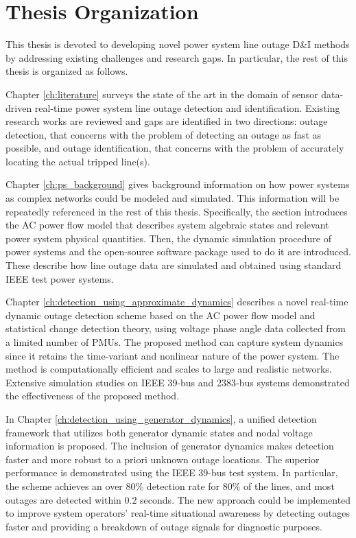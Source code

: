 \section{Thesis Organization}
This thesis is devoted to developing novel power system line outage D\&I methods by addressing existing challenges and research gaps. In particular, the rest of this thesis is organized as follows.

Chapter \ref{ch:literature} surveys the state of the art in the domain of sensor data-driven real-time power system line outage detection and identification. Existing research works are reviewed and gaps are identified in two directions: outage detection, that concerns with the problem of detecting an outage as fast as possible, and outage identification, that concerns with the problem of accurately locating the actual tripped line(s). 

Chapter \ref{ch:ps_background} gives background information on how power systems as complex networks could be modeled and simulated. This information will be repeatedly referenced in the rest of this thesis. Specifically, the section introduces the AC power flow model that describes system algebraic states and relevant power system physical quantities. Then, the dynamic simulation procedure of power systems and the open-source software package used to do it are introduced. These describe how line outage data are simulated and obtained using standard IEEE test power systems.


Chapter \ref{ch:detection_using_approximate_dynamics} describes a novel real-time dynamic outage detection scheme based on the AC power flow model and statistical change detection theory, using voltage phase angle data collected from a limited number of PMUs. The proposed method can capture system dynamics since it retains the time-variant and nonlinear nature of the power system. The method is computationally efficient and scales to large and realistic networks. Extensive simulation studies on IEEE 39-bus and 2383-bus systems demonstrated the effectiveness of the proposed method.

In Chapter \ref{ch:detection_using_generator_dynamics}, a unified detection framework that utilizes both generator dynamic states and nodal voltage information is proposed. The inclusion of generator dynamics makes detection faster and more robust to a priori unknown outage locations. The superior performance is demonstrated using the IEEE 39-bus test system. In particular, the scheme achieves an over 80\% detection rate for 80\% of the lines, and most outages are detected within 0.2 seconds. 
The new approach could be implemented to improve system operators' real-time situational awareness by detecting outages faster and providing a breakdown of outage signals for diagnostic purposes.

